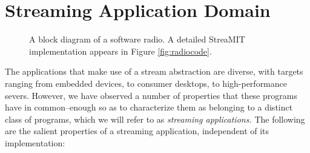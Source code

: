 \section{Streaming Application Domain}
\label{sec:domain}

\begin{figure*}[ht]
\centering
{}
\vspace{-6pt}
\caption{A block diagram of a software radio.  A detailed StreaMIT
implementation appears in Figure \ref{fig:radiocode}.}
\vspace{-6pt}
\label{fig:radiodiagram}
\end{figure*}

The applications that make use of a stream abstraction are diverse,
with targets ranging from embedded devices, to consumer desktops, to
high-performance severs.  However, we have observed a number of
properties that these programs have in common--enough so as to
characterize them as belonging to a distinct class of programs, which
we will refer to as {\it streaming applications.}  The following are
the salient properties of a streaming application, independent of its
implementation:
